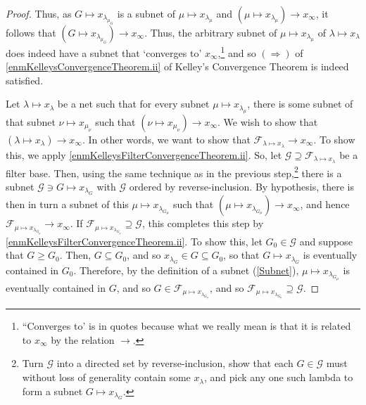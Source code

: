 \begin{thm}
\begin{proof}
Thus, as $G\mapsto x_{\lambda _{\mu _G}}$ is a subnet of $\mu \mapsto x_{\lambda _\mu}$ and $(\mu \mapsto x_{\lambda _\mu})\to x_\infty$, it follows that $(G\mapsto x_{\lambda _{\mu _G}})\to x_\infty$.  Thus, the arbitrary subnet of $\mu \mapsto x_{\lambda _\mu}$ of $\lambda \mapsto x_\lambda$ does indeed have a subnet that `converges to' $x_\infty$,\footnote{``Converges to' is in quotes because what we really mean is that it is related to $x_\infty$ by the relation $\to$.} and so $(\Rightarrow)$ of \ref{enmKelleysConvergenceTheorem.ii} of Kelley's Convergence Theorem is indeed satisfied.

Let $\lambda \mapsto x_\lambda$ be a net such that for every subnet $\mu \mapsto x_{\lambda _\mu}$, there is some subnet of that subnet $\nu \mapsto x_{\mu _\nu}$ such that $(\nu \mapsto x_{\mu _\nu})\to x_\infty$.  We wish to show that $(\lambda \mapsto x_\lambda )\to x_\infty$.  In other words, we want to show that $\mathcal{F}_{\lambda \mapsto x_\lambda}\to x_\infty$.  To show this, we apply \ref{enmKelleysFilterConvergenceTheorem.ii}.  So, let $\mathcal{G}\supseteq \mathcal{F}_{\lambda \mapsto x_\lambda}$ be a filter base.  Then, using the same technique as in the previous step,\footnote{Turn $\mathcal{G}$ into a directed set by reverse-inclusion, show that each $G\in \mathcal{G}$ must without loss of generality contain some $x_\lambda$, and pick any one such lambda to form a subnet $G\mapsto x_{\lambda _G}$.} there is a subnet $\mathcal{G}\ni G\mapsto x_{\lambda _G}$ with $\mathcal{G}$ ordered by reverse-inclusion.  By hypothesis, there is then in turn a subnet of this $\mu \mapsto x_{\lambda _{G_\mu}}$ such that $(\mu \mapsto x_{\lambda _{G_\mu}})\to x_\infty$, and hence $\mathcal{F}_{\mu \mapsto x_{\lambda _{G_\mu}}}\to x_\infty$.  If $\mathcal{F}_{\mu \mapsto x_{\lambda _{G_\mu}}}\supseteq \mathcal{G}$, this completes this step by \ref{enmKelleysFilterConvergenceTheorem.ii}.  To show this, let $G_0\in \mathcal{G}$ and suppose that $G\geq G_0$.  Then, $G\subseteq G_0$, and so $x_{\lambda _G}\in G\subseteq G_0$, so that $G\mapsto x_{\lambda _G}$ is eventually contained in $G_0$.  Therefore, by the definition of a subnet (\cref{Subnet}), $\mu \mapsto x_{\lambda _{G_\mu}}$ is eventually contained in $G$, and so $G\in \mathcal{F}_{\mu \mapsto x_{\lambda _{G_\mu}}}$, and so $\mathcal{F}_{\mu \mapsto x_{\lambda _{G_\mu}}}\supseteq \mathcal{G}$.


\end{proof}
\end{thm}
